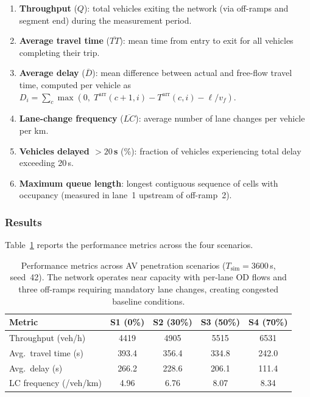 \documentclass[review,authoryear]{elsarticle}
\newcommand{\Tarr}{T^{\text{arr}}}
\begin{document}
\begin{enumerate}
    \item \textbf{Throughput} ($Q$): total vehicles exiting the network (via off-ramps and segment end) during the measurement period.
    \item \textbf{Average travel time} ($\overline{TT}$): mean time from entry to exit for all vehicles completing their trip.
    \item \textbf{Average delay} ($\overline{D}$): mean difference between actual and free-flow travel time, computed per vehicle as $D_i = \sum_{c} \max(0,\; \Tarr(c+1,i) - \Tarr(c,i) - \ell/v_f)$.
    \item \textbf{Lane-change frequency} ($\overline{LC}$): average number of lane changes per vehicle per km.
    \item \textbf{Vehicles delayed $> 20$\,s} (\%): fraction of vehicles experiencing total delay exceeding 20\,s.
    \item \textbf{Maximum queue length}: longest contiguous sequence of cells with occupancy (measured in lane~1 upstream of off-ramp~2).
\end{enumerate}

\subsubsection{Results}

Table~\ref{tab:results_mixed} reports the performance metrics across the four scenarios.

\begin{table}[ht]
\centering
\caption{Performance metrics across AV penetration scenarios ($T_{\text{sim}} = 3600$\,s, seed~42). The network operates near capacity with per-lane OD flows and three off-ramps requiring mandatory lane changes, creating congested baseline conditions.}
\label{tab:results_mixed}
\begin{tabular}{@{}lcccc@{}}
\toprule
Metric & S1 (0\%) & S2 (30\%) & S3 (50\%) & S4 (70\%) \\
\midrule
Throughput (veh/h) & 4419 & 4905 & 5515 & 6531 \\
Avg.\ travel time (s) & 393.4 & 356.4 & 334.8 & 242.0 \\
Avg.\ delay (s) & 266.2 & 228.6 & 206.1 & 111.4 \\
LC frequency (/veh/km) & 4.96 & 6.76 & 8.07 & 8.34 \\
\bottomrule
\end{tabular}
\end{table}
\end{document}
